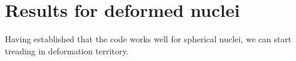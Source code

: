 \chapter{Results for deformed nuclei}
Having established that the code works well for spherical nuclei, we can start treading in deformation territory.

